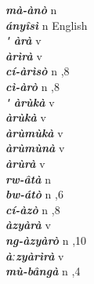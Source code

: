 \begin{multicols}{2}
{{\bfseries\itshape mà-ànò}} \relax  n   \relax  {} \relax   \relax  \\
{{\bfseries\itshape ányîsì}} \relax  n   \relax  {} \relax  English \relax  \\
{{\bfseries\itshape \'{} àrà}} \relax  v  \relax   \relax  {} \relax   \relax  \\
{{\bfseries\itshape àrìrà}} \relax  v  \relax  {} \relax   \relax  \\
{{\bfseries\itshape cí-àrìsò}} \relax  n  ,8  \relax   \relax  \\
{{\bfseries\itshape cì-àrò}} \relax  n  ,8  \relax   \relax  \\
{{\bfseries\itshape \'{} àrùkà}} \relax  v  \relax   \relax  {} \relax   \relax  \\
{{\bfseries\itshape àrùkà}} \relax  v  \relax   \relax  {} \relax   \relax  \\
{{\bfseries\itshape àrùmùkà}} \relax  v  \relax   \relax  {} \relax   \relax  \\
{{\bfseries\itshape àrùmùnà}} \relax  v  \relax   \relax  {} \relax   \relax  \\
{{\bfseries\itshape àrùrà}} \relax  v  \relax   \relax  {} \relax   \relax  \\
{{\bfseries\itshape rw-âtà}} \relax  n   \relax  {} \relax   \relax  \\
{{\bfseries\itshape bw-átò}} \relax  n  ,6  \relax   \relax  \\
{{\bfseries\itshape cí-àzò}} \relax  n  ,8  \relax   \relax  \\
{{\bfseries\itshape àzyàrà}} \relax  v  \relax   \relax  {} \relax   \relax  \\
{{\bfseries\itshape ng-àzyàrò}} \relax  n  ,10  \relax   \relax  \\
{{\bfseries\itshape àːzyàrìrà}} \relax  v  \relax   \relax  {} \relax   \relax  \\
{{\bfseries\itshape mù-bângà}} \relax  n  ,4  \relax   \relax  \\

\end{multicols}
